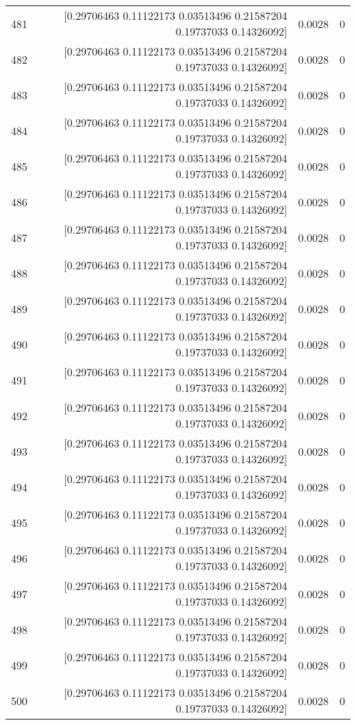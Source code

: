\begin{longtable}{lrrr}
481 & [0.29706463 0.11122173 0.03513496 0.21587204 0.19737033 0.14326092] & 0.0028 & 0 \\
482 & [0.29706463 0.11122173 0.03513496 0.21587204 0.19737033 0.14326092] & 0.0028 & 0 \\
483 & [0.29706463 0.11122173 0.03513496 0.21587204 0.19737033 0.14326092] & 0.0028 & 0 \\
484 & [0.29706463 0.11122173 0.03513496 0.21587204 0.19737033 0.14326092] & 0.0028 & 0 \\
485 & [0.29706463 0.11122173 0.03513496 0.21587204 0.19737033 0.14326092] & 0.0028 & 0 \\
486 & [0.29706463 0.11122173 0.03513496 0.21587204 0.19737033 0.14326092] & 0.0028 & 0 \\
487 & [0.29706463 0.11122173 0.03513496 0.21587204 0.19737033 0.14326092] & 0.0028 & 0 \\
488 & [0.29706463 0.11122173 0.03513496 0.21587204 0.19737033 0.14326092] & 0.0028 & 0 \\
489 & [0.29706463 0.11122173 0.03513496 0.21587204 0.19737033 0.14326092] & 0.0028 & 0 \\
490 & [0.29706463 0.11122173 0.03513496 0.21587204 0.19737033 0.14326092] & 0.0028 & 0 \\
491 & [0.29706463 0.11122173 0.03513496 0.21587204 0.19737033 0.14326092] & 0.0028 & 0 \\
492 & [0.29706463 0.11122173 0.03513496 0.21587204 0.19737033 0.14326092] & 0.0028 & 0 \\
493 & [0.29706463 0.11122173 0.03513496 0.21587204 0.19737033 0.14326092] & 0.0028 & 0 \\
494 & [0.29706463 0.11122173 0.03513496 0.21587204 0.19737033 0.14326092] & 0.0028 & 0 \\
495 & [0.29706463 0.11122173 0.03513496 0.21587204 0.19737033 0.14326092] & 0.0028 & 0 \\
496 & [0.29706463 0.11122173 0.03513496 0.21587204 0.19737033 0.14326092] & 0.0028 & 0 \\
497 & [0.29706463 0.11122173 0.03513496 0.21587204 0.19737033 0.14326092] & 0.0028 & 0 \\
498 & [0.29706463 0.11122173 0.03513496 0.21587204 0.19737033 0.14326092] & 0.0028 & 0 \\
499 & [0.29706463 0.11122173 0.03513496 0.21587204 0.19737033 0.14326092] & 0.0028 & 0 \\
500 & [0.29706463 0.11122173 0.03513496 0.21587204 0.19737033 0.14326092] & 0.0028 & 0 \\
\end{longtable}